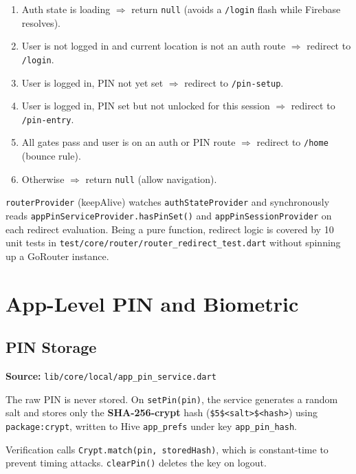 \documentclass[11pt,a4paper]{article}
\begin{document}
\begin{enumerate}
  \item Auth state is loading $\Rightarrow$ return \texttt{null} (avoids a
    \texttt{/login} flash while Firebase resolves).
  \item User is not logged in and current location is not an auth route
    $\Rightarrow$ redirect to \texttt{/login}.
  \item User is logged in, PIN not yet set $\Rightarrow$ redirect to
    \texttt{/pin-setup}.
  \item User is logged in, PIN set but not unlocked for this session
    $\Rightarrow$ redirect to \texttt{/pin-entry}.
  \item All gates pass and user is on an auth or PIN route
    $\Rightarrow$ redirect to \texttt{/home} (bounce rule).
  \item Otherwise $\Rightarrow$ return \texttt{null} (allow navigation).
\end{enumerate}

\texttt{routerProvider} (keepAlive) watches \texttt{authStateProvider} and synchronously
reads \texttt{appPinServiceProvider.hasPinSet()} and \texttt{appPinSessionProvider} on
each redirect evaluation. Being a pure function, redirect logic is covered by 10 unit
tests in \texttt{test/core/router/router\_redirect\_test.dart} without spinning up a
GoRouter instance.

\section{App-Level PIN and Biometric}

\subsection{PIN Storage}

\textbf{Source:} \texttt{lib/core/local/app\_pin\_service.dart}

The raw PIN is never stored. On \texttt{setPin(pin)}, the service generates a random
salt and stores only the \textbf{SHA-256-crypt} hash
(\texttt{\$5\$<salt>\$<hash>}) using \texttt{package:crypt}, written to Hive
\texttt{app\_prefs} under key \texttt{app\_pin\_hash}.

Verification calls \texttt{Crypt.match(pin, storedHash)}, which is constant-time to
prevent timing attacks. \texttt{clearPin()} deletes the key on logout.
\end{document}
